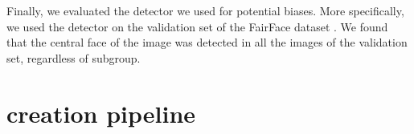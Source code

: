 Finally, we evaluated the detector we used for potential biases. More specifically, we used the detector on the validation set of the FairFace dataset \cite{karkkainen2021fairface}. We found that the central face of the image was detected in all the images of the validation set, regardless of subgroup.

\begin{table}
    \centering
    \renewcommand{\arraystretch}{1.1}
    \caption{Effect of face blurring on zero-shot performance. Face blurring improves the privacy preservation of our dataset, while affecting model performance negligibly. Results shown for the {\small \texttt{medium}} scale.}
    \label{tab:face_blur_test}
\end{table}

\section{\datanet \pool creation pipeline}
\label{app:metadata}


